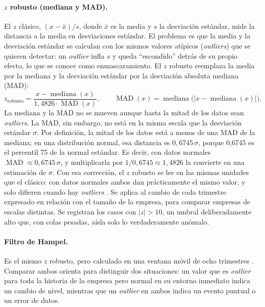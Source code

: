 \documentclass[12pt,letterpaper,oneside]{report}
\renewcommand{\_}{\UnderscoreOriginal\allowbreak}
\begin{document}
\paragraph{$z$ robusto (mediana y MAD).} El $z$ clásico, $(x - \bar{x})/s$, donde $\bar{x}$ es la media y $s$ la desviación estándar, mide la distancia a la media en desviaciones estándar. El problema es que la media y la desviación estándar se calculan con los mismos valores atípicos (\textit{outliers}) que se quieren detectar: un \textit{outlier} infla $s$ y queda ``escondido'' detrás de su propio efecto, lo que se conoce como enmascaramiento. El $z$ robusto reemplaza la media por la mediana y la desviación estándar por la desviación absoluta mediana (MAD):
\[
z_{\text{robusto}} = \frac{x - \operatorname{mediana}(x)}{1{,}4826 \cdot \operatorname{MAD}(x)},
\qquad
\operatorname{MAD}(x) = \operatorname{mediana}\bigl(|x - \operatorname{mediana}(x)|\bigr).
\]
La mediana y la MAD no se mueven aunque hasta la mitad de los datos sean \textit{outliers}. La MAD, sin embargo, no está en la misma escala que la desviación estándar $\sigma$. Por definición, la mitad de los datos está a menos de una MAD de la mediana; en una distribución normal, esa distancia es $0{,}6745\,\sigma$, porque 0,6745 es el percentil 75 de la normal estándar. Es decir, con datos normales $\operatorname{MAD} \approx 0{,}6745\,\sigma$, y multiplicarla por $1/0{,}6745 \approx 1{,}4826$ la convierte en una estimación de $\sigma$. Con esa corrección, el $z$ robusto se lee en las mismas unidades que el clásico: con datos normales ambos dan prácticamente el mismo valor, y solo difieren cuando hay \textit{outliers} \parencite{leys2013detecting}. Se aplica al cambio de cada trimestre expresado en relación con el tamaño de la empresa, para comparar empresas de escalas distintas. Se registran los casos con $|z| > 10$, un umbral deliberadamente alto que, con colas pesadas, aísla solo lo verdaderamente anómalo.

\paragraph{Filtro de Hampel.} Es el mismo $z$ robusto, pero calculado en una ventana móvil de ocho trimestres \parencite{hampel1974influence}. Comparar ambos orienta para distinguir dos situaciones: un valor que es \textit{outlier} para toda la historia de la empresa pero normal en su entorno inmediato indica un cambio de nivel, mientras que un \textit{outlier} en ambos indica un evento puntual o un error de datos.
\end{document}
